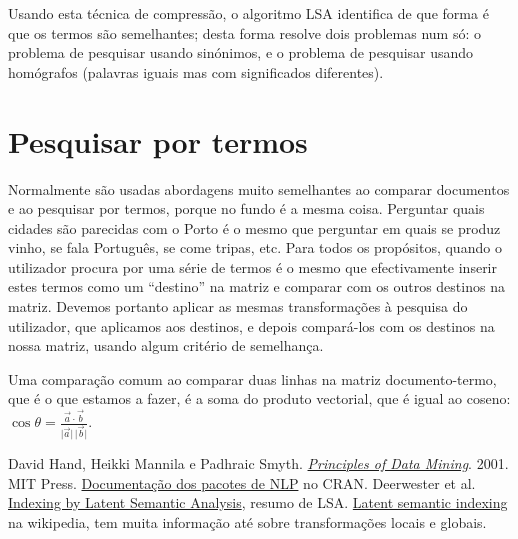 \documentclass[twocolumn]{article}
\newcommand{\norm}[1]{\lvert #1 \rvert}
\begin{document}
Usando esta técnica de compressão, o algoritmo LSA identifica de que forma é que os termos são semelhantes; desta forma resolve dois problemas num só: o problema de pesquisar usando sinónimos, e o problema de pesquisar usando homógrafos (palavras iguais mas com significados diferentes).

\section{Pesquisar por termos}
\label{query}

Normalmente são usadas abordagens muito semelhantes ao comparar documentos e ao pesquisar por termos, porque no fundo é a mesma coisa. Perguntar quais cidades são parecidas com o Porto é o mesmo que perguntar em quais se produz vinho, se fala Português, se come tripas, etc. Para todos os propósitos, quando o utilizador procura por uma série de termos é o mesmo que efectivamente inserir estes termos como um ``destino'' na matriz e comparar com os outros destinos na matriz. Devemos portanto aplicar as mesmas transformações à pesquisa do utilizador, que aplicamos aos destinos, e depois compará-los com os destinos na nossa matriz, usando algum critério de semelhança.

Uma comparação comum ao comparar duas linhas na matriz documento-termo, que é o que estamos a fazer, é a soma do produto vectorial, que é igual ao coseno: $\cos \theta = \frac{\vec{a} \cdot \vec{b}}{\norm{\vec{a}} \, \norm{\vec{b}}}$.

\begin{thebibliography}{99}
 David Hand, Heikki Mannila e Padhraic Smyth. \href{ftp://gamma.sbin.org/pub/doc/books/Principles_of_Data_Mining.pdf}{\emph{Principles of Data Mining}}. 2001. MIT Press.
 \href{http://cran.r-project.org/web/views/NaturalLanguageProcessing.html
}{Documentação dos pacotes de NLP} no CRAN.
 Deerwester et al. \href{http://lsa.colorado.edu/papers/JASIS.lsi.90.pdf}{Indexing by Latent Semantic Analysis}, resumo de LSA.
 \href{https://en.wikipedia.org/wiki/Latent_semantic_indexing}{Latent semantic indexing} na wikipedia, tem muita informação até sobre transformações locais e globais.
\end{thebibliography}
\end{document}
